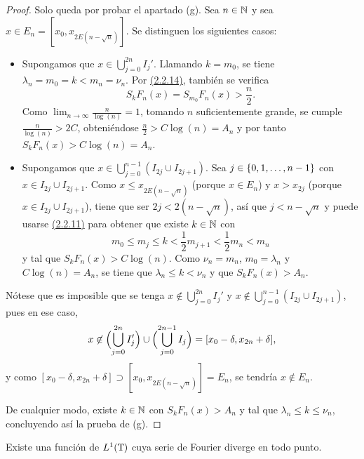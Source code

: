 \documentclass[a4paper, 12pt, oneside]{book}
\begin{document}
\begin{proof}
    Solo queda por probar el apartado (g). Sea $n \in \mathbb N$ y sea $x \in E_n=[x_0,x_{2E(n-\sqrt{n})}]$. Se distinguen los siguientes casos:
    \begin{itemize}
        \item Supongamos que $x\in\bigcup_{j=0}^{2n}I_j'$. Llamando $k = m_0$, se tiene $\lambda_n = m_0 = k < m_n = \nu_n$. Por \hyperref[2.2.14]{\color{blue}(2.2.14)}, también se verifica 
        \[S_{k}F_n(x) = S_{m_0}F_n(x) > \frac{n}{2}.\]
        Como $\lim_{n\to\infty} \frac{n}{\log(n)} = 1$, tomando $n$ suficientemente grande, se cumple $\frac{n}{\log(n)} > 2C$, obteniéndose $\frac{n}{2} > C\log(n) = A_n$ y por tanto $S_kF_n(x) > C\log(n) = A_n$.
        \item Supongamos que $x \in \bigcup_{j=0}^{n-1}(I_{2j}\cup I_{2j+1})$. Sea $j \in \{0,1,\mathellipsis,n-1\}$ con $x \in I_{2j} \cup I_{2j+1}$. Como $x \leq x_{2E(n-\sqrt{n})}$ (porque $x \in E_n$) y $x > x_{2j}$ (porque $x \in I_{2j} \cup I_{2j+1}$), tiene que ser $2j < 2(n-\sqrt{n})$, así que $j < n-\sqrt{n}$ y puede usarse \hyperref[2.2.11]{\color{blue}(2.2.11)} para obtener que existe $k \in \mathbb N$ con 
        \[m_0 \leq m_j \leq k < \frac{1}{2}m_{j+1} < \frac{1}{2}m_n < m_n\]
        y tal que $S_{k}F_n(x) >  C\log(n)$. Como $\nu_n = m_n$, $m_0 = \lambda_n$ y $C\log(n) = A_n$, se tiene que $\lambda_n \leq k < \nu_n$ y que $S_{k}F_n(x) > A_n$.
    \end{itemize}
    Nótese que es imposible que se tenga $x\not\in \bigcup_{j=0}^{2n}I_j'$ y $x \not\in \bigcup_{j=0}^{n-1}(I_{2j}\cup I_{2j+1})$, pues en ese caso,
    \[x\not\in \Bigl(\bigcup_{j=0}^{2n}I_j'\Bigr) \cup\Bigl(\bigcup_{j=0}^{2n-1}I_j\Bigr) = [x_0-\delta,x_{2n}+\delta],\]
    y como $[x_0-\delta,x_{2n}+\delta] \supset [x_0,x_{2E(n-\sqrt{n})}] = E_n$, se tendría $x \not\in E_n$.

    De cualquier modo, existe $k \in \mathbb N$ con $S_kF_n(x) > A_n$ y tal que $\lambda_n \leq k \leq \nu_n$, concluyendo así la prueba de (g).
\end{proof}

\begin{theorem}
    Existe una función de $L^1(\mathbb T)$ cuya serie de Fourier diverge en todo punto.
\end{theorem}
\end{document}

